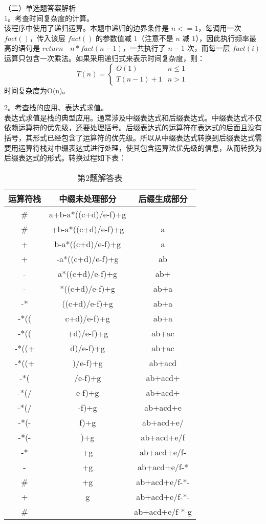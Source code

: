 （二）单选题答案解析\\
1。考查时间复杂度的计算。\\
该程序中使用了递归运算。本题中递归的边界条件是 $n<=1$，每调用一次 $fact()$，传入该层 $fact()$ 的参数值减 $1$（注意不是 $n$ 减 $1$），因此执行频率最高的语句是 $return \quad n*fact(n-1)$，一共执行了 $n-1$ 次，而每一层 $fact(i)$ 运算只包含一次乘法。如果采用递归式来表示时间复杂度，则： \\
\begin{equation}
T(n)= 
\begin{cases}
O(1) & n \le 1\\
T(n-1)+1 & n>1
\end{cases}
~
\end{equation}
时间复杂度为O(n)。

2。考查栈的应用、表达式求值。\\
表达式求值是栈的典型应用。通常涉及中缀表达式和后缀表达式。中缀表达式不仅依赖运算符的优先级，还要处理括号。后缀表达式的运算符在表达式的后面且没有括号，其形式已经包含了运算符的优先级。所以从中缀表达式转换到后缀表达式需要用运算符栈对中缀表达式进行处理，使其包含运算法优先级的信息，从而转换为后缀表达式的形式。转换过程如下表： \\
\begin{table}[ht]
\centering
\caption{第2题解答表}\label{tab_CSN12_4}
\begin{tabular}{|c|c|c|}
\hline
运算符栈 & 中缀未处理部分 & 后缀生成部分 \\
\hline
\# &a+b-a*((c+d)/e-f)+g & \\
\hline
\# &+b-a*((c+d)/e-f)+g &a \\
\hline
+ &b-a*((c+d)/e-f)+g &a \\
\hline
+ &-a*((c+d)/e-f)+g &ab \\
\hline
- &a*((c+d)/e-f)+g &ab+ \\
\hline
- &*((c+d)/e-f)+g &ab+a \\
\hline
-* &((c+d)/e-f)+g &ab+a \\
\hline
-*(( &c+d)/e-f)+g &ab+a \\
\hline
-*(( &+d)/e-f)+g &ab+ac \\
\hline
-*((+ &d)/e-f)+g &ab+ac \\
\hline
-*((+ &)/e-f)+g &ab+acd \\
\hline
-*( &/e-f)+g &ab+acd+ \\
\hline
-*(/ &e-f)+g &ab+acd+ \\
\hline
-*(/ &-f)+g &ab+acd+e \\
\hline
-*(- &f)+g &ab+acd+e/ \\
\hline
-*(- &)+g &ab+acd+e/f \\
\hline
-* &+g &ab+acd+e/f- \\
\hline
- &+g &ab+acd+e/f-* \\
\hline
\# &+g &ab+acd+e/f-*- \\
\hline
+ &g &ab+acd+e/f-*- \\
\hline
\# &&ab+acd+e/f-*-g \\
\hline
\end{tabular}
\end{table}

